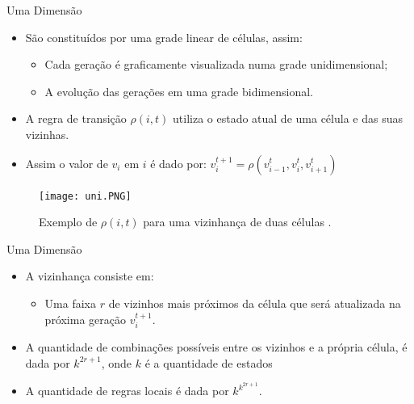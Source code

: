 \documentclass[compress, hide notes]{beamer}
\begin{document}
\begin{frame}{Uma Dimensão \cite{pt}}
	
	\begin{itemize}
        \setlength\itemsep{11pt}
		\item São constituídos por uma grade linear de células, assim: 
        
        \begin{itemize}
        	\setlength\itemsep{6pt}
			\item Cada geração é graficamente visualizada numa grade unidimensional;
            \item A evolução das gerações em uma grade bidimensional.
		\end{itemize}
        
		\item A regra de transição $\rho(i,t)$ utiliza o estado atual de uma célula e das suas vizinhas.
		
		\item Assim o valor de $v_i$ em $i$ é dado por: $\boxed{v_i^{t+1}=\rho(v^t_{i-1}, v_i^t, v^t_{i+1})}$
		
	\end{itemize}
		\begin{figure}[h]
			\center			
			\texttt{[image: uni.PNG]}
			\caption{Exemplo de $\rho(i,t)$ para uma vizinhança de duas células \cite{pt}.}	
		\end{figure}
\end{frame}	

\begin{frame}{Uma Dimensão \cite{ufmg}}
	\begin{itemize}
        \setlength\itemsep{12pt}
		\item A vizinhança consiste em:
        \begin{itemize}
			\item Uma faixa $r$ de vizinhos mais próximos da célula que será atualizada na próxima geração $v_i^{t+1}$.
        \end{itemize}
		
		\item A quantidade de combinações possíveis entre os vizinhos e a própria célula, é dada por $k^{2r+1}$, onde $k$ é a quantidade de estados
		\item A quantidade de regras locais é dada por $k^{k^{2r+1}}$.
		
	\end{itemize}
	
\end{frame}	
\end{document}
